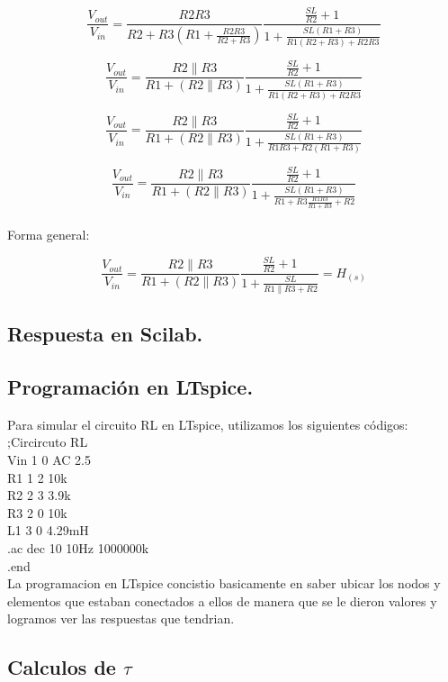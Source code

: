 \documentclass[12pt,letterpaper]{IEEEtran}
\begin{document}
	$$\frac{V_{out}}{V_{in}}=\frac{R2R3}{R2+R3(R1+\frac{R2R3}{R2+R3})} \frac{\frac{SL}{R2}+1}{1+\frac{SL(R1+R3)}{R1(R2+R3)+R2R3}}$$
	
	$$\frac{V_{out}}{V_{in}}=\frac{R2\parallel R3}{R1+(R2\parallel R3)} \frac{\frac{SL}{R2}+1}{1+\frac{SL(R1+R3)}{R1(R2+R3)+R2R3}}$$
	
	$$\frac{V_{out}}{V_{in}}=\frac{R2\parallel R3}{R1+(R2\parallel R3)} \frac{\frac{SL}{R2}+1}{1+\frac{SL(R1+R3)}{R1R3+R2(R1+R3)}}$$
	
	
	$$\frac{V_{out}}{V_{in}}=\frac{R2\parallel R3}{R1+(R2\parallel R3)} \frac{\frac{SL}{R2}+1}{1+\frac{SL(R1+R3)}{R1+R3\frac{R1R3}{R1+R3}+R2}}$$\\
	
	Forma general:
	
	$$\frac{V_{out}}{V_{in}}=\frac{R2\parallel R3}{R1+(R2\parallel R3)} \frac{\frac{SL}{R2}+1}{1+\frac{SL}{R1\parallel R3+R2}}=H_(s)$$
	
	\subsection{\textbf{Respuesta en Scilab.}}
	
	
	
	\subsection{\textbf{Programación en LTspice.}}
	
	Para simular el circuito RL en LTspice, utilizamos los siguientes códigos:
	\\
	;Circircuto RL\\
	Vin 1 0 AC 2.5\\
	R1 1 2 10k\\
	R2 2 3 3.9k\\
	R3 2 0 10k\\
	L1 3 0 4.29mH\\
	.ac dec 10 10Hz 1000000k\\
	.end\\
	
	
	La programacion en  LTspice concistio basicamente en saber ubicar los nodos y elementos que estaban conectados a ellos de manera que se le dieron valores y logramos ver las respuestas que tendrian.
	
	\subsection{\textbf{Calculos de $\tau$}}
	
\end{document}
